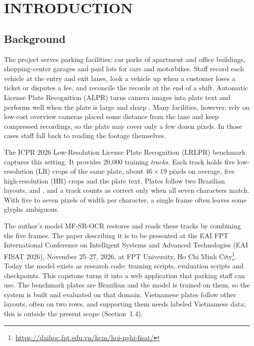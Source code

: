 \section{INTRODUCTION}

\subsection{Background}

The project serves parking facilities: car parks of apartment and office buildings, shopping-center
garages and paid lots for cars and motorbikes. Staff record each vehicle at the entry and exit lanes,
look a vehicle up when a customer loses a ticket or disputes a fee, and reconcile the records at the
end of a shift. Automatic License Plate Recognition (ALPR) turns camera images into plate text and
performs well when the plate is large and sharp \cite{laroca2018robust}. Many facilities, however,
rely on low-cost overview cameras placed some distance from the lane and keep compressed recordings,
so the plate may cover only a few dozen pixels. In those cases staff fall back to reading the footage
themselves.

The ICPR 2026 Low-Resolution License Plate Recognition (LRLPR) benchmark \cite{laroca2026icpr}
captures this setting. It provides 20{,}000 training \emph{tracks}. Each track holds five
low-resolution (LR) crops of the same plate, about $46\times19$ pixels on average, five
high-resolution (HR) crops and the plate text. Plates follow two Brazilian layouts, 
and , and a track counts as correct only when all seven characters match. With five
to seven pixels of width per character, a single frame often leaves some glyphs ambiguous.

The author's model MF-SR-OCR restores and reads these tracks by combining the five frames. The
paper describing it is to be presented at the EAI FPT International Conference on Intelligent
Systems and Advanced Technologies (EAI FISAT 2026), November 25--27, 2026, at FPT University,
Ho Chi Minh City\footnote{\url{https://daihoc.fpt.edu.vn/hcm/hoi-nghi-fisat/}}. Today the
model exists as research code: training scripts, evaluation scripts and checkpoints. This capstone
turns it into a web application that parking staff can use. The benchmark plates are Brazilian and
the model is trained on them, so the system is built and evaluated on that domain. Vietnamese plates follow other layouts, often on two rows, and supporting them needs labeled
Vietnamese data; this is outside the present scope (Section~1.4).

